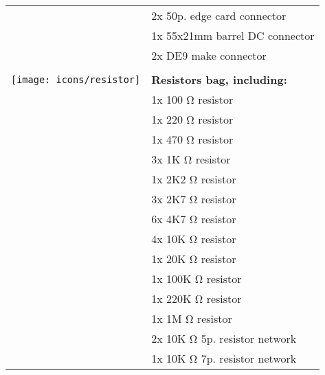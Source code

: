 \begin{longtable}{m{10mm}|l}
	                                      & 2x 50p. edge card connector                                 \\
	                                      & 1x 55x21mm barrel DC connector                              \\
	                                      & 2x DE9 make connector                                       \\
	                                      &                                                             \\
	\texttt{[image: icons/resistor]}      & {\bf Resistors bag, including:}                             \\
	                                      & 1x 100 \si{\ohm} resistor                                   \\
	                                      & 1x 220 \si{\ohm} resistor                                   \\
	                                      & 1x 470 \si{\ohm} resistor                                   \\
	                                      & 3x 1K \si{\ohm} resistor                                    \\
	                                      & 1x 2K2 \si{\ohm} resistor                                   \\
	                                      & 3x 2K7 \si{\ohm} resistor                                   \\
	                                      & 6x 4K7 \si{\ohm} resistor                                   \\
	                                      & 4x 10K \si{\ohm} resistor                                   \\
	                                      & 1x 20K \si{\ohm} resistor                                   \\
	                                      & 1x 100K \si{\ohm} resistor                                  \\
	                                      & 1x 220K \si{\ohm} resistor                                  \\
	                                      & 1x 1M \si{\ohm} resistor                                    \\
	                                      & 2x 10K \si{\ohm} 5p. resistor network                       \\
	                                      & 1x 10K \si{\ohm} 7p. resistor network                       \\

\end{longtable}
